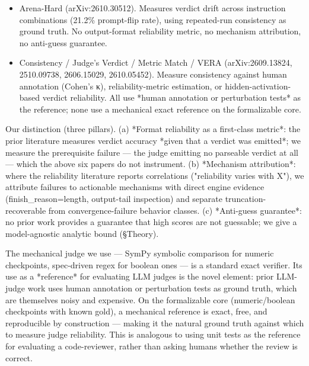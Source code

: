 \documentclass[10pt,twocolumn]{article}
\begin{document}
\begin{itemize}
  \item Arena-Hard (arXiv:2610.30512). Measures verdict drift across instruction combinations (21.2\% prompt-flip rate), using repeated-run consistency as ground truth. No output-format reliability metric, no mechanism attribution, no anti-guess guarantee.
\end{itemize}


\begin{itemize}
  \item Consistency / Judge's Verdict / Metric Match / VERA (arXiv:2609.13824, 2510.09738, 2606.15029, 2610.05452). Measure consistency against human annotation (Cohen's κ), reliability-metric estimation, or hidden-activation-based verdict reliability. All use *human annotation or perturbation tests* as the reference; none use a mechanical exact reference on the formalizable core.
\end{itemize}


Our distinction (three pillars). (a) *Format reliability as a first-class metric*: the prior literature measures verdict accuracy *given that a verdict was emitted*; we measure the prerequisite failure — the judge emitting no parseable verdict at all — which the above six papers do not instrument. (b) *Mechanism attribution*: where the reliability literature reports correlations ("reliability varies with X"), we attribute failures to actionable mechanisms with direct engine evidence (finish\_reason=length, output-tail inspection) and separate truncation-recoverable from convergence-failure behavior classes. (c) *Anti-guess guarantee*: no prior work provides a guarantee that high scores are not guessable; we give a model-agnostic analytic bound (§Theory).


The mechanical judge we use — SymPy symbolic comparison for numeric checkpoints, spec-driven regex for boolean ones — is a standard exact verifier. Its use as a *reference* for evaluating LLM judges is the novel element: prior LLM-judge work uses human annotation or perturbation tests as ground truth, which are themselves noisy and expensive. On the formalizable core (numeric/boolean checkpoints with known gold), a mechanical reference is exact, free, and reproducible by construction — making it the natural ground truth against which to measure judge reliability. This is analogous to using unit tests as the reference for evaluating a code-reviewer, rather than asking humans whether the review is correct.
\end{document}
